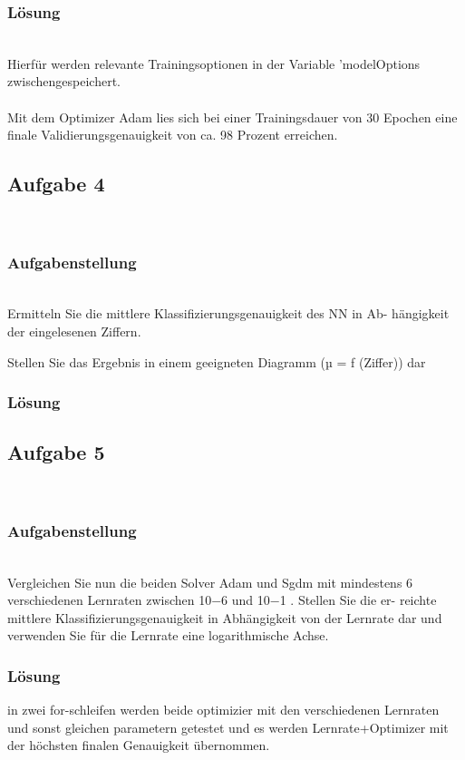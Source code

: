 \documentclass[8pt,a4paper]{article}
\begin{document}
\subsubsection{Lösung}
\\
Hierfür werden relevante Trainingsoptionen in der Variable 'modelOptions zwischengespeichert.
\\

\\
Mit dem Optimizer Adam lies sich bei einer Trainingsdauer von 30 Epochen eine finale Validierungsgenauigkeit von ca. 98 Prozent erreichen.
\\
\subsection{Aufgabe 4}
\\
\subsubsection{Aufgabenstellung}
\\Ermitteln Sie die mittlere Klassifizierungsgenauigkeit des NN in Ab-
hängigkeit der eingelesenen Ziffern.

Stellen Sie das Ergebnis in einem geeigneten Diagramm (µ = f (Ziffer))
dar
\subsubsection{Lösung}
\subsection{Aufgabe 5}
\\
\subsubsection{Aufgabenstellung}
\\
Vergleichen Sie nun die beiden Solver Adam und Sgdm mit mindestens 6
verschiedenen Lernraten zwischen 10−6 und 10−1 . Stellen Sie die er-
reichte mittlere Klassifizierungsgenauigkeit in Abhängigkeit von der
Lernrate dar und verwenden Sie für die Lernrate eine logarithmische
Achse.
\\
\subsubsection{Lösung}
in zwei for-schleifen werden beide optimizier mit den verschiedenen Lernraten und sonst gleichen parametern getestet und es werden Lernrate+Optimizer mit der höchsten finalen Genauigkeit übernommen.

\end{document}

